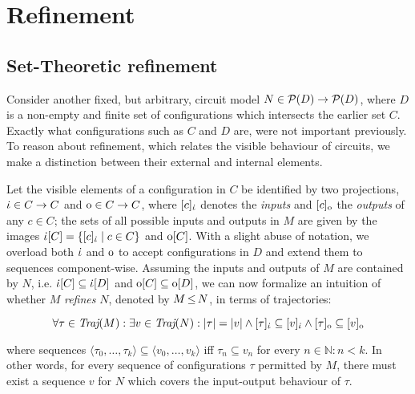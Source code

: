 \section{Refinement}

\subsection{Set-Theoretic refinement}

Consider another fixed, but arbitrary, circuit model $N \in \mathcal{P}(D) \rightarrow \mathcal{P}(D)$, where $D$ is a non-empty and finite set of configurations which intersects the earlier set $C$. Exactly what configurations such as $C$ and $D$ are, were not important previously. To reason about refinement, which relates the visible behaviour of circuits, we make a distinction between their external and internal elements.


Let the visible elements of a configuration in $C$ be identified by two projections, $\dot{\iota} \in C \rightarrow C$ and $\mathrm{o} \in C \rightarrow C$, where $[c]_{\dot{\iota}}$ denotes the \textit{inputs} and $[c]_{\mathrm{o}}$ the \textit{outputs} of any $c \in C$; the sets of all possible inputs and outputs in $M$ are given by the images $\dot{\iota}[C] = \{ [c]_{\dot{\iota}} \mid c \in C \}$ and $\mathrm{o}[C]$. With a slight abuse of notation, we overload both $\dot{\iota}$ and $\mathrm{o}$ to accept configurations in $D$ and extend them to sequences component-wise. Assuming the inputs and outputs of $M$ are contained by $N$, i.e. $\dot{\iota}[C] \subseteq \dot{\iota}[D]$ and $\mathrm{o}[C] \subseteq \mathrm{o}[D]$, we can now formalize an intuition of whether $M$ \textit{refines} $N$, denoted by $M \operatorname{\leq} N$, in terms of trajectories:

\begin{equation*}
\forall \tau \in \operatorname{\textit{Traj}}(M) : \exists v \in \operatorname{\textit{Traj}}(N) : | \tau | = | v | \wedge [\tau]_{\dot{\iota}} \subseteq [v]_{\dot{\iota}} \wedge [\tau]_{\mathrm{o}} \subseteq [v]_{\mathrm{o}}
\end{equation*}

\noindent where sequences $\langle \tau_{0}, \ldots, \tau_{k} \rangle \subseteq \langle v_{0}, \ldots, v_{k} \rangle$ iff $\tau_{n} \subseteq v_{n}$ for every $n \in \mathbb{N} : n < k$. In other words, for every sequence of configurations $\tau$ permitted by $M$, there must exist a sequence $v$ for $N$ which covers the input-output behaviour of $\tau$.

